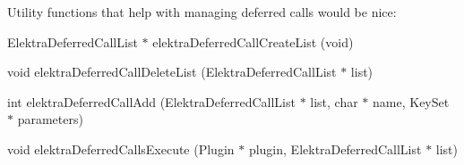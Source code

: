 Utility functions that help with managing deferred calls would be nice\+:


\begin{DoxyItemize}
\item {\ttfamily Elektra\+Deferred\+Call\+List $\ast$ elektra\+Deferred\+Call\+Create\+List (void)}
\item {\ttfamily void elektra\+Deferred\+Call\+Delete\+List (Elektra\+Deferred\+Call\+List $\ast$ list)}
\item {\ttfamily int elektra\+Deferred\+Call\+Add (Elektra\+Deferred\+Call\+List $\ast$ list, char $\ast$ name, Key\+Set $\ast$ parameters)}
\item {\ttfamily void elektra\+Deferred\+Calls\+Execute (Plugin $\ast$ plugin, Elektra\+Deferred\+Call\+List $\ast$ list)} 
\end{DoxyItemize}